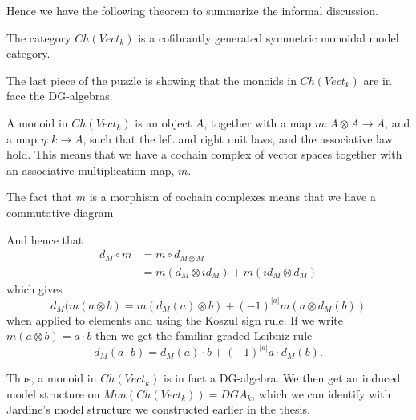 Hence we have the following theorem to summarize the informal discussion. 

\begin{theorem}
The category $Ch(Vect_k)$ is a cofibrantly generated symmetric monoidal model category.
\end{theorem}

The last piece of the puzzle is showing that the monoids in $Ch(Vect_k)$ are in face the DG-algebras. 

A monoid in $Ch(Vect_k)$ is an object $A$, together with a map $m\colon A\otimes A\longrightarrow A$, and a map $\eta\colon k\longrightarrow A$, such that the left and right unit laws, and the associative law hold. This means that we have a cochain complex of vector spaces together with an associative multiplication map, $m$. 

The fact that $m$ is a morphism of cochain complexes means that we have a commutative diagram
\begin{center}
\end{center}
And hence that
\begin{align*}
    d_M\circ m
    &= m\circ d_{M\otimes M} \\
    &= m(d_M\otimes id_M) + m(id_M\otimes d_M)
\end{align*}
which gives 
\begin{equation*}
    d_M(m(a\otimes b) = m(d_M(a)\otimes b) + (-1)^{|a|}m(a\otimes d_M(b))
\end{equation*}
when applied to elements and using the Koszul sign rule. If we write $m(a\otimes b) = a\cdot b$ then we get the familiar graded Leibniz rule 
\begin{equation*}
    d_M(a\cdot b) = d_M(a)\cdot b + (-1)^{|a|}a\cdot d_M(b).
\end{equation*}

Thus, a monoid in $Ch(Vect_k)$ is in fact a DG-algebra. We then get an induced model structure on $Mon(Ch(Vect_k)) = DGA_k$, which we can identify with Jardine's model structure we constructed earlier in the thesis.

